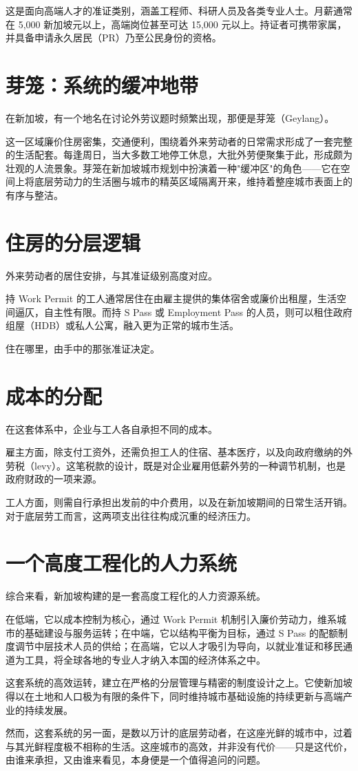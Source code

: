 这是面向高端人才的准证类别，涵盖工程师、科研人员及各类专业人士。月薪通常在 5,000 新加坡元以上，高端岗位甚至可达 15,000 元以上。持证者可携带家属，并具备申请永久居民（PR）乃至公民身份的资格。

\section{芽笼：系统的缓冲地带}

在新加坡，有一个地名在讨论外劳议题时频繁出现，那便是芽笼（Geylang）。

这一区域廉价住房密集，交通便利，围绕着外来劳动者的日常需求形成了一套完整的生活配套。每逢周日，当大多数工地停工休息，大批外劳便聚集于此，形成颇为壮观的人流景象。芽笼在新加坡城市规划中扮演着一种"缓冲区"的角色——它在空间上将底层劳动力的生活圈与城市的精英区域隔离开来，维持着整座城市表面上的有序与整洁。

\section{住房的分层逻辑}

外来劳动者的居住安排，与其准证级别高度对应。

持 Work Permit 的工人通常居住在由雇主提供的集体宿舍或廉价出租屋，生活空间逼仄，自主性有限。而持 S Pass 或 Employment Pass 的人员，则可以租住政府组屋（HDB）或私人公寓，融入更为正常的城市生活。

住在哪里，由手中的那张准证决定。

\section{成本的分配}

在这套体系中，企业与工人各自承担不同的成本。

雇主方面，除支付工资外，还需负担工人的住宿、基本医疗，以及向政府缴纳的外劳税（levy）。这笔税款的设计，既是对企业雇用低薪外劳的一种调节机制，也是政府财政的一项来源。

工人方面，则需自行承担出发前的中介费用，以及在新加坡期间的日常生活开销。对于底层劳工而言，这两项支出往往构成沉重的经济压力。

\section{一个高度工程化的人力系统}

综合来看，新加坡构建的是一套高度工程化的人力资源系统。

在低端，它以成本控制为核心，通过 Work Permit 机制引入廉价劳动力，维系城市的基础建设与服务运转；在中端，它以结构平衡为目标，通过 S Pass 的配额制度调节中层技术人员的供给；在高端，它以人才吸引为导向，以就业准证和移民通道为工具，将全球各地的专业人才纳入本国的经济体系之中。

这套系统的高效运转，建立在严格的分层管理与精密的制度设计之上。它使新加坡得以在土地和人口极为有限的条件下，同时维持城市基础设施的持续更新与高端产业的持续发展。

然而，这套系统的另一面，是数以万计的底层劳动者，在这座光鲜的城市中，过着与其光鲜程度极不相称的生活。这座城市的高效，并非没有代价——只是这代价，由谁来承担，又由谁来看见，本身便是一个值得追问的问题。
